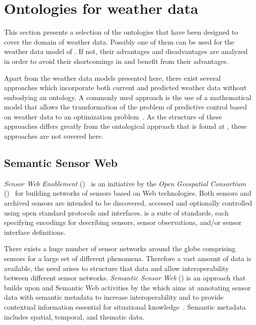 \section{Ontologies for weather data}
\label{sec:weather_ontologies}

This section presents a selection of the ontologies that have been designed to cover the domain of weather data. Possibly one of them can be used for the weather data model of \thinkhome. If not, their advantages and disadvantages are analyzed in order to avoid their shortcomings in \thinkhome and benefit from their advantages.

Apart from the weather data models presented here, there exist several approaches which incorporate both current and predicted weather data without embodying an ontology. A commonly used approach is the use of a mathematical model that allows the transformation of the problem of predictive control based on weather data to an optimization problem~\cite{NonOntologicalApproach1,NonOntologicalApproach2}. As the structure of these approaches differs greatly from the ontological approach that is found at \thinkhome, these approaches are not covered here.

\subsection{Semantic Sensor Web}


\emph{Sensor Web Enablement} ()~\cite{SensorWeb} is an initiative by the \emph{Open Geospatial Consortium} ()~\cite{OGC} for building networks of sensors based on Web technologies. Both sensors and archived sensors are intended to be discovered, accessed and optionally controlled using open standard protocols and interfaces.  is a suite of standards, each specifying encodings for describing sensors, sensor observations, and/or sensor interface definitions.

There exists a huge number of sensor networks around the globe comprising sensors for a large set of different phenomena. Therefore a vast amount of data is available, the need arises to structure that data and allow interoperability between different sensor networks. \emph{Semantic Sensor Web} () is an approach that builds upon  and Semantic Web activities by the  which aims at annotating sensor data with semantic metadata to increase interoperability and to provide contextual information essential for situational knowledge~\cite{SemanticSensorWeb}. Semantic metadata includes spatial, temporal, and thematic data.

